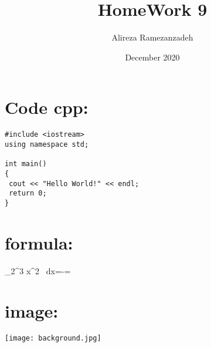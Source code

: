 \documentclass{article}
\title{HomeWork 9}
\author{Alireza Ramezanzadeh}
\date{December 2020}
\begin{document}
\maketitle

\section{Code cpp:}



\begin{lstlisting}
#include <iostream>
using namespace std;

int main()
{
 cout << "Hello World!" << endl;
 return 0;
}
\end{lstlisting}
\section{formula:}
\huge \int_2^3 x^2 \, dx=-=

\section{image:}

\begin{center}
\texttt{[image: background.jpg]}
\label{fig}
\end{center}
\end{document}
